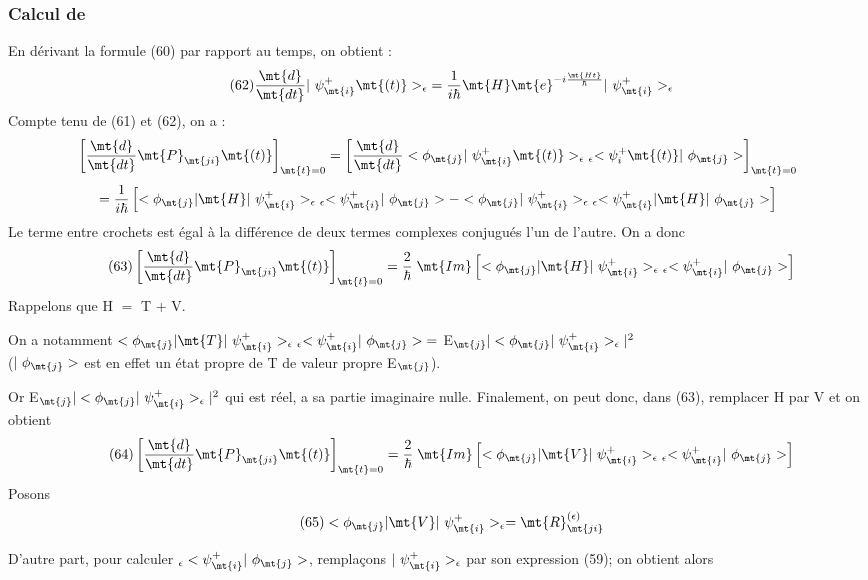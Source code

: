 \subsubsection{Calcul de}%
En dérivant la formule (60) par rapport au temps, on obtient :
\[
\tag{62}\frac{\mt{d}}{\mt{dt}}|\ \psi_\mt{i}^+\mt{(t)}>_\epsilon\;=\frac{1}{i\hbar}\mt{ H }\mt{e}^{-i\frac{\mt{Ht}}{\hbar}}|\ \psi_\mt{i}^+>_\epsilon
\]
Compte tenu de (61) et (62), on a :
\[
\left[\frac{\mt{d}}{\mt{dt}}\mt{P}_\mt{ji}\mt{(t)}\right]_{\mt{t}=0}=
\left[\frac{\mt{d}}{\mt{dt}}<\phi_\mt{j }|\ \psi_\mt{i}^+\mt{(t)}>_{\epsilon\ \epsilon}
<\psi_i^+\mt{(t)}|\ \phi_\mt{j}>\right]_{\mt{t}=0}
\]
\[
=\frac{1}{i\hbar}
\left[<\phi_\mt{j }|\mt{ H }|\ \psi_\mt{i}^+>_{\epsilon\ \epsilon}<\psi_\mt{i}^+|\ \phi_\mt{j}>-
<\phi_\mt{j }|\ \psi_\mt{i}^+>_{\epsilon\ \epsilon}<\psi_\mt{i}^+|\mt{ H }|\ \phi_\mt{j}>\right]
\]
Le terme entre crochets est égal à la différence de deux termes complexes
conjugués l'un de l'autre. On a donc
\[
\tag{63}\left[\frac{\mt{d}}{\mt{dt}}\mt{P}_\mt{ji}\mt{(t)}\right]_{\mt{t}=0}=\frac{2}{\hbar}\;\mt{Im}
\left[<\phi_\mt{j }|\mt{ H }|\ \psi_\mt{i}^+>_{\epsilon\ \epsilon}<\psi_\mt{i}^+|\ \phi_\mt{j}>\right]
\]
Rappelons que H $=$ T + V.

On a notamment $<\phi_\mt{j }|\mt{ T }|\ \psi_\mt{i}^+>_{\epsilon\ \epsilon}<\psi_\mt{i}^+|\ \phi_\mt{j}>\;
=$ E$_\mt{j }|<\phi_\mt{j }|\ \psi_\mt{i}^+>_\epsilon|^2$ \\
($|\ \phi_\mt{j}>$ est en effet un état propre de T de valeur propre E$_\mt{j}$).

Or E$_\mt{j }|<\phi_\mt{j }|\ \psi_\mt{i}^+>_\epsilon|^2$ qui est réel, a sa partie imaginaire nulle.
Finalement, on peut donc, dans (63), remplacer H par V et on obtient
\[
\tag{64}\left[\frac{\mt{d}}{\mt{dt}}\mt{P}_\mt{ji}\mt{(t)}\right]_{\mt{t}=0}=\frac{2}{\hbar}\;\mt{Im}
\left[<\phi_\mt{j }|\mt{ V }|\ \psi_\mt{i}^+>_{\epsilon\ \epsilon}<\psi_\mt{i}^+|\ \phi_\mt{j}>\right]
\]
Posons
\[
\tag{65}<\phi_\mt{j }|\mt{ V }|\ \psi_\mt{i}^+>_\epsilon=\mt{R}_\mt{ji}^{(\epsilon)}
\]

D'autre part, pour calculer $_\epsilon<\psi_\mt{i}^+|\ \phi_\mt{j}>$, remplaçons $|\ \psi_\mt{i}^+>_\epsilon$ par son
expression (59); on obtient alors


